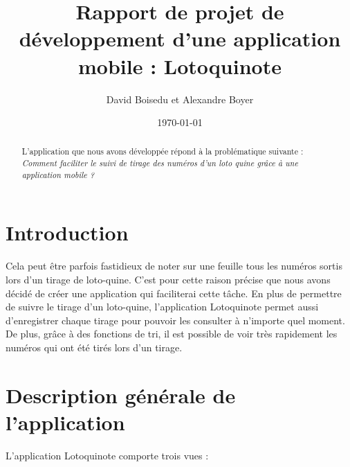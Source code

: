 \documentclass{article}
\title{Rapport de projet de développement d'une application mobile : Lotoquinote}
\author{David Boisedu et Alexandre Boyer}
\date{\today}
\begin{document}
\maketitle

\begin{abstract}
\begin{center}
L'application que nous avons développée répond à la problématique suivante : 
\newline \textit{Comment faciliter le suivi de tirage des numéros d'un loto quine grâce à une application mobile ?}
\end{center}
\end{abstract}

\section{Introduction}
\label{section:intro}

Cela peut être parfois fastidieux de noter sur une feuille tous les numéros sortis lors d'un tirage de loto-quine. C'est pour cette raison précise que nous avons décidé de créer une application qui faciliterai cette tâche. En plus de permettre de suivre le tirage d'un loto-quine, l'application Lotoquinote permet aussi d'enregistrer chaque tirage pour pouvoir les consulter à n'importe quel moment. De plus, grâce à des fonctions de tri, il est possible de voir très rapidement les numéros qui ont été tirés lors d'un tirage.

\section{Description générale de l'application}

L'application Lotoquinote comporte trois vues :
\end{document}
